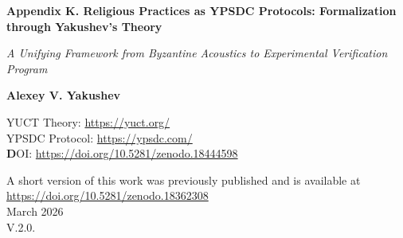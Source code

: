 \documentclass[12pt,a4paper]{article}
\begin{document}
	
	\begin{titlepage}
		\begin{center}
			\vspace*{0cm}
			
			\Huge\textbf{Appendix K. Religious Practices as YPSDC Protocols: Formalization through Yakushev's Theory}
			
			\vspace{1cm}
			
			\small\textit{A Unifying Framework from Byzantine Acoustics to Experimental Verification Program}
			
			\vspace{0.5cm}
			
			\small\textbf{Alexey V. Yakushev}
			
			\vspace{0cm}
			
	YUCT Theory: \url{https://yuct.org/}\\
YPSDC Protocol: \url{https://ypsdc.com/}\\


\vspace{2cm}
\textbf DOI: \url{https://doi.org/10.5281/zenodo.18444598}\\

\vspace{1cm}

\vspace{0cm}
\large 
A short version of this work was previously published and is available at\\ \url{https://doi.org/10.5281/zenodo.18362308}\\
\vspace{1cm}
March 2026 \\ \large V.2.0.
			\newpage
			\begin{abstract}
				\noindent
				This document presents a comprehensive formalization of religious practices through the lens of Yakushev's Unified Coordination Theory (YUCT) and YPSDC (Yakushev Protocol for Synchronous Distributed Coordination). Part 1 demonstrates how religious rituals function as highly optimized coordination protocols using pre-distributed dictionaries, with Byzantine church acoustics serving as a paradigmatic example of architectural optimization for coordination efficiency. Part 2 outlines an extreme unification power of YUCT framework and presents a detailed research program for experimental verification, emphasizing student research as the cornerstone for scientific validation. The framework provides measurable metrics ($K_{\mathrm{eff}}$), testable predictions, and cross-disciplinary applications from physics and biology to sociology and religious studies.
			\end{abstract}
			

\end{center}
\end{titlepage}
\end{document}
